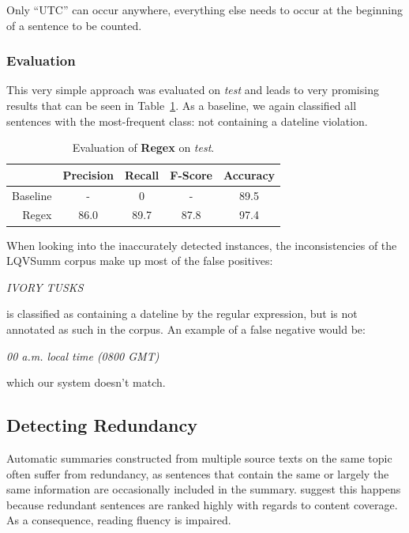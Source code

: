 \documentclass[a4paper,10pt]{scrartcl}
\theoremstyle{style}
\begin{document}
Only ``UTC'' can occur anywhere, everything else needs to occur at the beginning of a sentence to be counted.

\subsubsection{Evaluation}
This very simple approach was evaluated on \textit{test} and leads to very promising results that can be seen in Table~\ref{eval_regex}. As a baseline, we again classified all sentences with the most-frequent class: not containing a dateline violation.

\begin{table}
\begin{center}
\begin{tabular}{|r|c|c|c|c|}
  \hline
  & \textbf{Precision} & \textbf{Recall} & \textbf{F-Score} & \textbf{Accuracy}\\
  \hline
  Baseline & - & 0 & - & 89.5\\
  \hline
  Regex & 86.0 & 89.7 & 87.8 & 97.4\\
  \hline
  \end{tabular}
\end{center}
\caption{Evaluation of \textbf{Regex} on \textit{test}.}
\label{eval_regex}
\end{table}


When looking into the inaccurately detected instances, the inconsistencies of the LQVSumm corpus make up most of the false positives:

\begin{framed}
\textit{IVORY TUSKS}
\end{framed}

is classified as containing a dateline by the regular expression, but is not annotated as such in the corpus. An example of a false negative would be:

\begin{framed}
\textit{00 a.m. local time (0800 GMT)}
\end{framed}

which our system doesn't match.

\newpage
\subsection{Detecting Redundancy}
\label{redundancy}

Automatic summaries constructed from multiple source texts on the same topic often suffer from redundancy, as sentences that contain the same or largely the same information are occasionally included in the summary. \cite{friedrichlqvsumm} suggest this happens because redundant sentences are ranked highly with regards to content coverage.
As a consequence, reading fluency is impaired.
\end{document}
